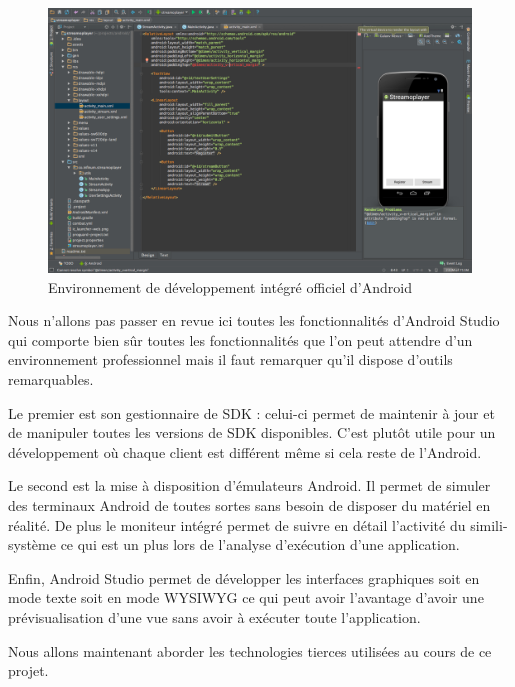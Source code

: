 \begin{figure}[H]
    \centering
    \includegraphics[width=\textwidth]{./img/android-studio.png}
    \caption{Environnement de développement intégré officiel d’Android}
    \label{androidstudio}
\end{figure}

Nous n’allons pas passer en revue ici toutes les fonctionnalités d’Android Studio qui comporte bien sûr toutes les fonctionnalités que l’on peut attendre d’un environnement professionnel mais il faut remarquer qu’il dispose d’outils remarquables.

Le premier est son gestionnaire de SDK : celui-ci permet de maintenir à jour et de manipuler toutes les versions de SDK disponibles. C’est plutôt utile pour un développement où chaque client est différent même si cela reste de l’Android.

Le second est la mise à disposition d’émulateurs Android. Il permet de simuler des terminaux Android de toutes sortes sans besoin de disposer du matériel en réalité. De plus le moniteur intégré permet de suivre en détail l’activité du simili-système ce qui est un plus lors de l’analyse d’exécution d’une application.

Enfin, Android Studio permet de développer les interfaces graphiques soit en mode texte soit en mode WYSIWYG ce qui peut avoir l’avantage d’avoir une prévisualisation d’une vue sans avoir à exécuter toute l’application.

Nous allons maintenant aborder les technologies tierces utilisées au cours de ce projet.
